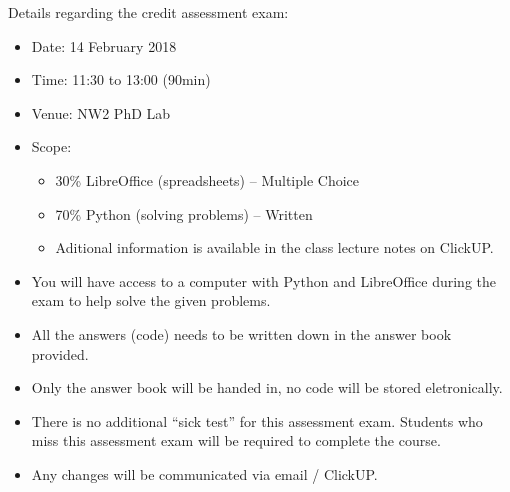     \noindent
    Details regarding the credit assessment exam:
    \begin{itemize}
        \item Date: 14 February 2018
        \item Time: 11:30 to 13:00 (90min)
        \item Venue: NW2 PhD Lab
        \item Scope:
        \begin{itemize}
            \item 30\% LibreOffice (spreadsheets) -- Multiple Choice
            \item 70\% Python (solving problems) -- Written
            \item Aditional information is available in the class lecture notes
                on ClickUP.
        \end{itemize}
        \item You will have access to a computer with Python and LibreOffice
            during the exam to help solve the given problems.
        \item All the answers (code) needs to be written down in the answer
            book provided.
        \item Only the answer book will be handed in, no code will be
            stored eletronically.
        \item There is no additional ``sick test'' for this assessment exam.
            Students who miss this assessment exam will be required to complete
            the course.
        \item Any changes will be communicated via email / ClickUP.
    \end{itemize}

